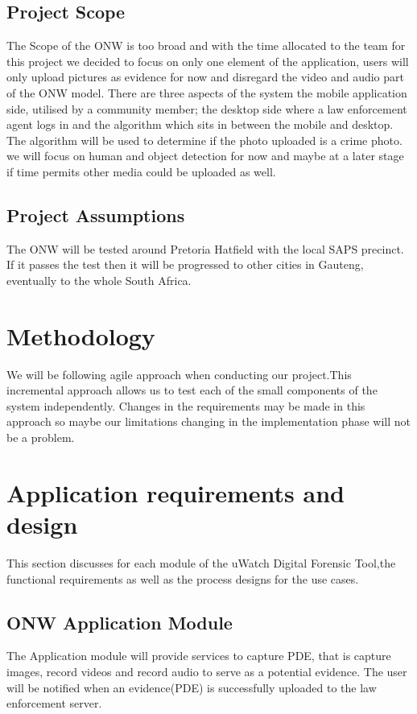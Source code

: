 \documentclass[a4paper,12pt]{article}
\begin{document}
\subsection{Project Scope}
The Scope of the ONW is too broad and with the time allocated to the team for this project we decided to focus on only one element of the application, users will only upload pictures as evidence for now and disregard the video and audio part of the ONW model.  There are three aspects of the system the mobile application side, utilised by a community member; the desktop side where a law enforcement agent logs in and the algorithm which sits in between the mobile and desktop.  The algorithm will be used to determine if the photo uploaded is a crime photo. we will focus on human and object detection for now and maybe at a later stage if time permits other media could be uploaded as well. 

\subsection{Project Assumptions}
The ONW will be tested around Pretoria Hatfield with the local SAPS precinct. If it passes the test then it will be progressed to other cities in Gauteng, eventually to the whole South Africa. 

\section{Methodology}
We will be following agile approach when conducting our project.This incremental approach allows us to test each of the small components of the system independently.
Changes in the requirements may be made in this approach so maybe our limitations changing in the implementation phase will not be a problem.
 

\section{Application requirements and design}
This section discusses for each module of the uWatch Digital Forensic Tool,the functional requirements
as well as the process designs for the use cases.
\subsection{ONW Application Module}
The Application module will provide services to capture PDE, that is capture images, record videos and record audio to serve as a potential evidence. The user will be notified when an evidence(PDE) is successfully uploaded to the law enforcement server.
\end{document}
